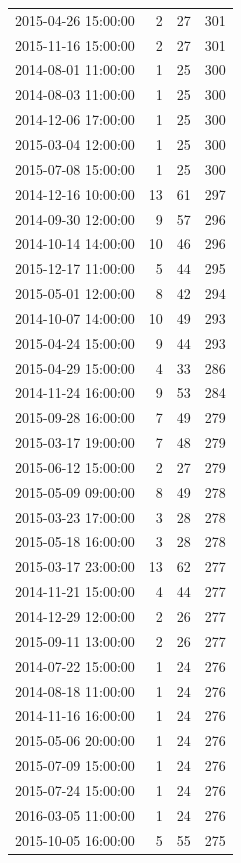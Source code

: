 \begin{tabular}{lrrr}
2015-04-26 15:00:00 & 2 & 27 & 301 \\
2015-11-16 15:00:00 & 2 & 27 & 301 \\
2014-08-01 11:00:00 & 1 & 25 & 300 \\
2014-08-03 11:00:00 & 1 & 25 & 300 \\
2014-12-06 17:00:00 & 1 & 25 & 300 \\
2015-03-04 12:00:00 & 1 & 25 & 300 \\
2015-07-08 15:00:00 & 1 & 25 & 300 \\
2014-12-16 10:00:00 & 13 & 61 & 297 \\
2014-09-30 12:00:00 & 9 & 57 & 296 \\
2014-10-14 14:00:00 & 10 & 46 & 296 \\
2015-12-17 11:00:00 & 5 & 44 & 295 \\
2015-05-01 12:00:00 & 8 & 42 & 294 \\
2014-10-07 14:00:00 & 10 & 49 & 293 \\
2015-04-24 15:00:00 & 9 & 44 & 293 \\
2015-04-29 15:00:00 & 4 & 33 & 286 \\
2014-11-24 16:00:00 & 9 & 53 & 284 \\
2015-09-28 16:00:00 & 7 & 49 & 279 \\
2015-03-17 19:00:00 & 7 & 48 & 279 \\
2015-06-12 15:00:00 & 2 & 27 & 279 \\
2015-05-09 09:00:00 & 8 & 49 & 278 \\
2015-03-23 17:00:00 & 3 & 28 & 278 \\
2015-05-18 16:00:00 & 3 & 28 & 278 \\
2015-03-17 23:00:00 & 13 & 62 & 277 \\
2014-11-21 15:00:00 & 4 & 44 & 277 \\
2014-12-29 12:00:00 & 2 & 26 & 277 \\
2015-09-11 13:00:00 & 2 & 26 & 277 \\
2014-07-22 15:00:00 & 1 & 24 & 276 \\
2014-08-18 11:00:00 & 1 & 24 & 276 \\
2014-11-16 16:00:00 & 1 & 24 & 276 \\
2015-05-06 20:00:00 & 1 & 24 & 276 \\
2015-07-09 15:00:00 & 1 & 24 & 276 \\
2015-07-24 15:00:00 & 1 & 24 & 276 \\
2016-03-05 11:00:00 & 1 & 24 & 276 \\
2015-10-05 16:00:00 & 5 & 55 & 275 \\

\end{tabular}

